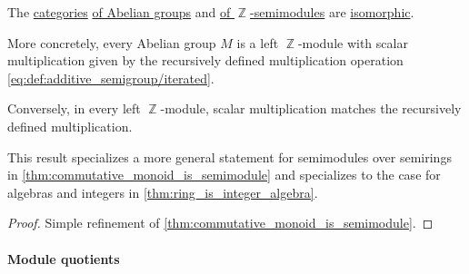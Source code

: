 \begin{proposition}\label{thm:abelian_group_is_module}
  The \hyperref[def:category]{categories} \hyperref[def:abelian_group]{of Abelian groups} and \hyperref[def:module/category]{of \( \BbbZ \)-semimodules} are \hyperref[def:isomorphism_of_categories]{isomorphic}.

  More concretely, every Abelian group \( M \) is a left \( \BbbZ \)-module with scalar multiplication given by the recursively defined multiplication operation \eqref{eq:def:additive_semigroup/iterated}.

  Conversely, in every left \( \BbbZ \)-module, scalar multiplication matches the recursively defined multiplication.
\end{proposition}
\begin{comments}
  \item This result specializes a more general statement for semimodules over semirings in \cref{thm:commutative_monoid_is_semimodule} and specializes to the case for algebras and integers in \cref{thm:ring_is_integer_algebra}.
\end{comments}
\begin{proof}
  Simple refinement of \cref{thm:commutative_monoid_is_semimodule}.
\end{proof}

\paragraph{Module quotients}

